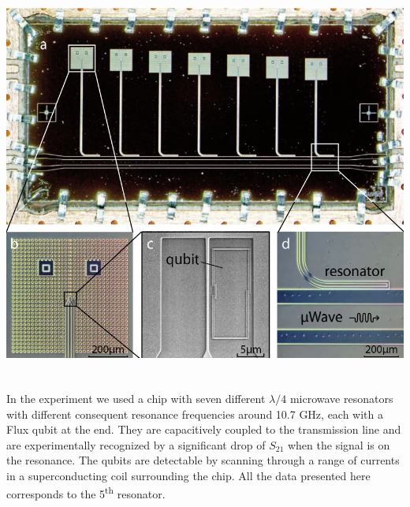 \documentclass[a0, portrait]{a0poster}
\begin{document}
\begin{multicols}{2}
\begin{tcolorbox}[left=1cm, right=1cm, top=0.5cm, bottom=0.5cm, 
                  title={\Large Sample design}, bottomtitle=.3cm,toptitle=.5cm
                  ]
\begin{minipage}{0.5\textwidth}
\centering
\includegraphics[height=13cm]{Pictures/marcus_chip}
\end{minipage}
\begin{minipage}{0.5\textwidth}
In the experiment we used a chip with seven different $\lambda/4$ microwave resonators with different consequent resonance frequencies around 10.7 GHz, each with a Flux qubit at the end. They are capacitively coupled to the transmission line and are experimentally recognized by a significant drop of $S_{21}$ when the signal is on the resonance. The qubits are detectable by scanning through a range of currents in a superconducting coil surrounding the chip. All the data presented here corresponds to the 5\textsuperscript{th} resonator. 
\end{minipage}
\end{tcolorbox}


\end{multicols}
\end{document}
